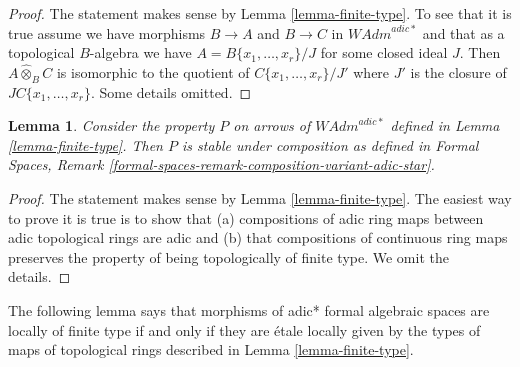\documentclass{stacks-project}
\theoremstyle{plain}
\newtheorem{lemma}[subsection]{Lemma}
\theoremstyle{definition}
\theoremstyle{remark}
\numberwithin{equation}{subsection}
\begin{document}
\begin{proof}
The statement makes sense by Lemma \ref{lemma-finite-type}.
To see that it is true assume we have morphisms
$B \to A$ and $B \to C$ in $\textit{WAdm}^{adic*}$
and that as a topological $B$-algebra we have
$A = B\{x_1, \ldots, x_r\}/J$ for some closed ideal $J$.
Then $A \widehat{\otimes}_B C$ is isomorphic to the
quotient of $C\{x_1, \ldots, x_r\}/J'$ where
$J'$ is the closure of $JC\{x_1, \ldots, x_r\}$.
Some details omitted.
\end{proof}

\begin{lemma}
\label{lemma-composition-finite-type}
Consider the property $P$ on arrows of $\textit{WAdm}^{adic*}$ defined in
Lemma \ref{lemma-finite-type}. Then $P$ is stable under composition as
defined in Formal Spaces, Remark
\ref{formal-spaces-remark-composition-variant-adic-star}.
\end{lemma}

\begin{proof}
The statement makes sense by Lemma \ref{lemma-finite-type}.
The easiest way to prove it is true is to show that
(a) compositions of adic ring maps between adic topological rings
are adic and (b) that compositions of continuous ring maps
preserves the property of being topologically of finite type.
We omit the details.
\end{proof}

\noindent
The following lemma says that morphisms of adic* formal algebraic spaces
are locally of finite type if and only if they are \'etale locally given
by the types of maps of topological rings described in
Lemma \ref{lemma-finite-type}.
\end{document}
